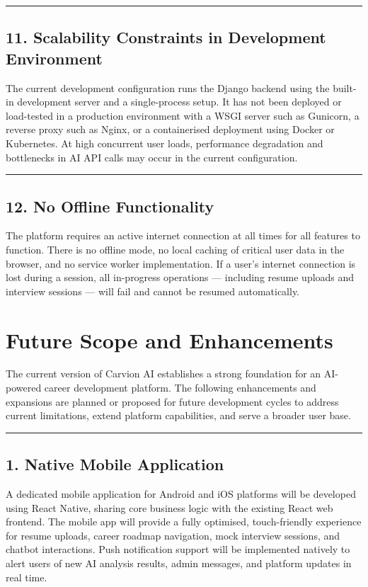 \documentclass[12pt]{article}
\begin{document}
\noindent\rule{\textwidth}{0.4pt}

\subsection{11. Scalability Constraints in Development Environment}

The current development configuration runs the Django backend using the built-in development server and a single-process setup. It has not been deployed or load-tested in a production environment with a WSGI server such as Gunicorn, a reverse proxy such as Nginx, or a containerised deployment using Docker or Kubernetes. At high concurrent user loads, performance degradation and bottlenecks in AI API calls may occur in the current configuration.

\noindent\rule{\textwidth}{0.4pt}

\subsection{12. No Offline Functionality}

The platform requires an active internet connection at all times for all features to function. There is no offline mode, no local caching of critical user data in the browser, and no service worker implementation. If a user's internet connection is lost during a session, all in-progress operations — including resume uploads and interview sessions — will fail and cannot be resumed automatically.

\clearpage
\section{Future Scope and Enhancements}

The current version of Carvion AI establishes a strong foundation for an AI-powered career development platform. The following enhancements and expansions are planned or proposed for future development cycles to address current limitations, extend platform capabilities, and serve a broader user base.

\noindent\rule{\textwidth}{0.4pt}

\subsection{1. Native Mobile Application}

A dedicated mobile application for Android and iOS platforms will be developed using React Native, sharing core business logic with the existing React web frontend. The mobile app will provide a fully optimised, touch-friendly experience for resume uploads, career roadmap navigation, mock interview sessions, and chatbot interactions. Push notification support will be implemented natively to alert users of new AI analysis results, admin messages, and platform updates in real time.
\end{document}
